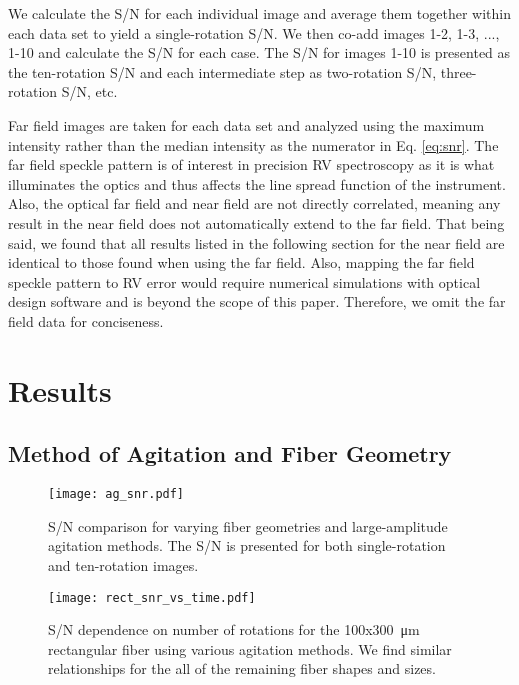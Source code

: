\documentclass[twocolumn]{emulateapj}
\begin{document}
We calculate the S/N for each individual image and average them together within each data set to yield a single-rotation S/N. We then co-add images 1-2, 1-3, ..., 1-10 and calculate the S/N for each case. The S/N for images 1-10 is presented as the ten-rotation S/N and each intermediate step as two-rotation S/N, three-rotation S/N, etc.

Far field images are taken for each data set and analyzed using the maximum intensity rather than the median intensity as the numerator in Eq. \ref{eq:snr}. The far field speckle pattern is of interest in precision RV spectroscopy as it is what illuminates the optics and thus affects the line spread function of the instrument. Also, the optical far field and near field are not directly correlated, meaning any result in the near field does not automatically extend to the far field. That being said, we found that all results listed in the following section for the near field are identical to those found when using the far field. Also, mapping the far field speckle pattern to RV error would require numerical simulations with optical design software and is beyond the scope of this paper. Therefore, we omit the far field data for conciseness.

\section{Results}
\label{sec:results}

\subsection{Method of Agitation and Fiber Geometry}
\label{subsec:ag_snr}

\begin{figure}
\centering
	\texttt{[image: ag\_snr.pdf]}
	\caption{S/N comparison for varying fiber geometries and large-amplitude agitation methods. The S/N is presented for both single-rotation and ten-rotation images.}
\label{fig:ag_snr}
\end{figure}

\begin{figure}
\centering
	\texttt{[image: rect\_snr\_vs\_time.pdf]}
	\caption{S/N dependence on number of rotations for the 100x\SI{300}{\micro\meter} rectangular fiber using various agitation methods. We find similar relationships for the all of the remaining fiber shapes and sizes.}
\label{fig:rect_snr_vs_time}
\end{figure}
\end{document}
